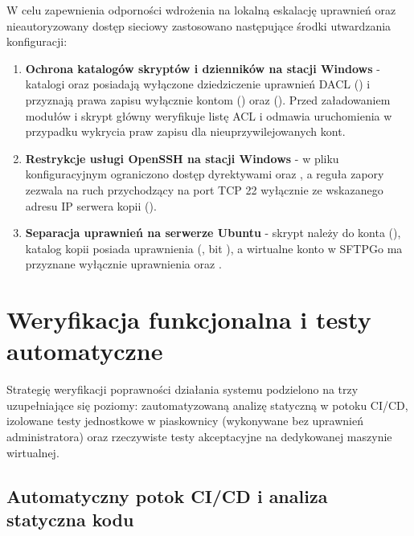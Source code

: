 W celu zapewnienia odporności wdrożenia na lokalną eskalację uprawnień oraz nieautoryzowany dostęp sieciowy zastosowano następujące środki utwardzania konfiguracji:
\begin{enumerate}
    \item \textbf{Ochrona katalogów skryptów i dzienników na stacji Windows} - katalogi  oraz  posiadają wyłączone dziedziczenie uprawnień DACL () i przyznają prawa zapisu wyłącznie kontom  () oraz  (). Przed załadowaniem modułów  i  skrypt główny weryfikuje listę ACL i odmawia uruchomienia w przypadku wykrycia praw zapisu dla nieuprzywilejowanych kont.
    \item \textbf{Restrykcje usługi OpenSSH na stacji Windows} - w pliku konfiguracyjnym  ograniczono dostęp dyrektywami  oraz , a reguła zapory  zezwala na ruch przychodzący na port TCP 22 wyłącznie ze wskazanego adresu IP serwera kopii ().
    \item \textbf{Separacja uprawnień na serwerze Ubuntu} - skrypt  należy do konta  (), katalog kopii  posiada uprawnienia  (, bit ), a wirtualne konto  w SFTPGo ma przyznane wyłącznie uprawnienia  oraz .
\end{enumerate}

\section{Weryfikacja funkcjonalna i testy automatyczne}\label{sec:testy-weryfikacja}

Strategię weryfikacji poprawności działania systemu podzielono na trzy uzupełniające się poziomy: zautomatyzowaną analizę statyczną w potoku CI/CD, izolowane testy jednostkowe w piaskownicy (wykonywane bez uprawnień administratora) oraz rzeczywiste testy akceptacyjne na dedykowanej maszynie wirtualnej.

\subsection{Automatyczny potok CI/CD i analiza statyczna kodu}\label{subsec:potok-ci-cd}

